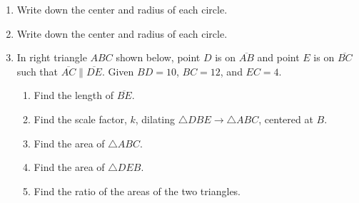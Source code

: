 \documentclass[12pt, oneside]{article}
\begin{document}
\begin{enumerate}[itemsep=1.7cm]
\newpage
\item Write down the center and radius of each circle.
\begin{enumerate}
\end{enumerate}


\item Write down the center and radius of each circle.
\begin{enumerate}
\end{enumerate}

\item In right triangle $ABC$ shown below, point $D$ is on $\overline{AB}$ and point $E$ is on $\overline{BC}$ such that $\overline{AC} \parallel \overline{DE}$. Given $BD=10$, $BC=12$, and $EC=4$.
  \begin{center}
  \end{center}
  \begin{enumerate}
    \item Find the length of $\overline{BE}$. \vspace{0.5cm}
    \item Find the scale factor, $k$, dilating $\triangle DBE \rightarrow \triangle ABC$, centered at $B$. \vspace{1.5cm}
    \item Find the area of $\triangle ABC$. \vspace{2.5cm}
    \item Find the area of $\triangle DEB$. \vspace{2.5cm}
    \item Find the ratio of the areas of the two triangles. \vspace{2.5cm}
  \end{enumerate}

\end{enumerate}
\end{document}
